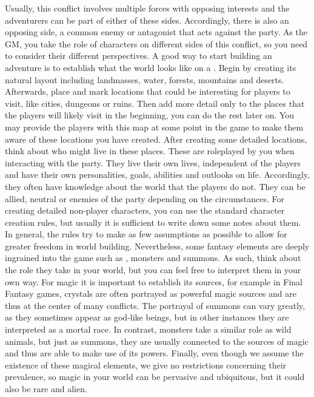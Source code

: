 Usually, this conflict involves multiple forces with opposing interests and the adventurers can be part of either of these sides.
Accordingly, there is also an opposing side, a common enemy or antagonist that acts against the party.
As the GM, you take the role of characters on different sides of this conflict, so you need to consider their different perspectives. 
%
\ofpar
%
A good way to start building an adventure is to establish what the world looks like on a . 
Begin by creating its natural layout including landmasses, water, forests, mountains and deserts. 
Afterwards, place and mark locations that could be interesting for players to visit, like cities, dungeons or ruins.
Then add more detail only to the places that the players will likely visit in the beginning, you can do the rest later on.
You may provide the players with this map at some point in the game to make them aware of these locations you have created.
After creating some detailed locations, think about who might live in these places.
These  are roleplayed by you when interacting with the party.
They live their own lives, independent of the players and have their own personalities, goals, abilities and outlooks on life. 
Accordingly, they often have knowledge about the world that the players do not.
They can be allied, neutral or enemies of the party depending on the circumstances.
For creating detailed non-player characters, you can use the standard character creation rules, but usually it is sufficient to write down some notes about them.
%
\ofpar
%
In general, the rules try to make as few assumptions as possible to allow for greater freedom in world building.
Nevertheless, some fantasy elements are deeply ingrained into the game such as , monsters and summons.
As such, think about the role they take in your world, but you can feel free to interpret them in your own way.
For magic it is important to establish its sources, for example in Final Fantasy games, crystals are often portrayed as powerful magic sources and are thus at the center of many conflicts.
The portrayal of summons can vary greatly, as they sometimes appear as god-like beings, but in other instances they are interpreted as a mortal race.
In contrast, monsters take a similar role as wild animals, but just as summons, they are usually connected to the sources of magic and thus are able to make use of its powers.
Finally, even though we assume the existence of these magical elements, we give no restrictions concerning their prevalence, so magic in your world can be pervasive and ubiquitous, but it could also be rare and alien.
